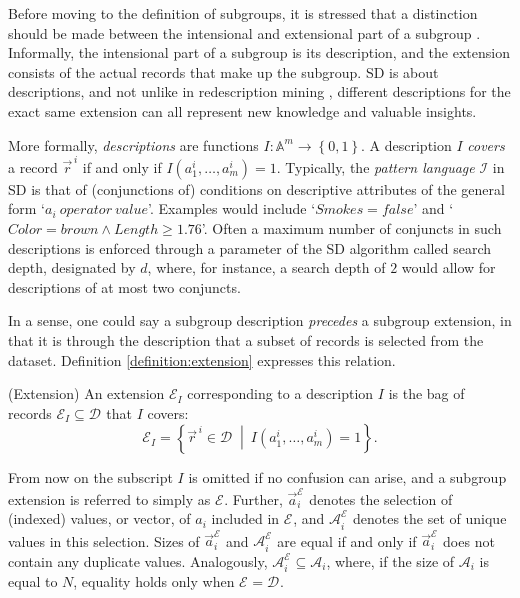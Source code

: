 \documentclass[smallextended]{svjour3}
\newcommand{\subgroup}[1]{\mbox{`$#1$'}}
\newcommand{\ds}[1]{\mathcal{D}_{#1}}
\newcommand{\extension}[1]{\mathcal{E}_{#1}}
\newcommand{\intension}{I}
\newcommand{\sd}{SD}
\begin{document}
Before moving to the definition of subgroups, it is stressed that a distinction should be made between the intensional and extensional part of a subgroup \cite{meeng:2014}.
Informally, the intensional part of a subgroup is its description, and the extension consists of the actual records that make up the subgroup.
\sd{} is about descriptions, and not unlike in redescription mining \cite{galbrun:2018}, different descriptions for the exact same extension can all represent new knowledge and valuable insights.

More formally, \emph{descriptions} are functions $\intension{}: \mathbb{A}^m \to \left\{0,1\right\}$.
A description $\intension{}$ \emph{covers} a record $\vec{r}^{\,i}$ if and only if $\intension{} \left(a_1^i, \ldots ,a_m^i\right) = 1$.
Typically, the \emph{pattern language} $\mathcal{\intension{}}$ in \sd{} is that of (conjunctions of) conditions on descriptive attributes of the general form \subgroup{a_i\ operator\ value}.
Examples would include \subgroup{Smokes = false} and \subgroup{Color = brown \wedge Length \geq 1.76}.
Often a maximum number of conjuncts in such descriptions is enforced through a parameter of the \sd{} algorithm called search depth, designated by $d$, where, for instance, a search depth of $2$ would allow for descriptions of at most two conjuncts.

In a sense, one could say a subgroup description \emph{precedes} a subgroup extension, in that it is through the description that a subset of records is selected from the dataset.
Definition \ref{definition:extension} expresses this relation.

\begin{definition}{(Extension)}
\label{definition:extension}
An extension $\extension{\intension{}}$ corresponding to a description $\intension{}$ is the bag of records $\extension{\intension{}} \subseteq \ds{}$ that $\intension{}$ covers:
\begin{displaymath}
  \extension{\intension{}}=\left\{\vec{r}^{\,i} \in \ds{}\ \middle|\ \intension{}\left(a_1^i, \ldots, a_m^i\right) = 1\right\}.
\end{displaymath}
\end{definition}

From now on the subscript $\intension{}$ is omitted if no confusion can arise, and a subgroup extension is referred to simply as $\extension{}$.
Further, $\vec{a}_i^{\extension{}}$ denotes the selection of (indexed) values, or vector, of $a_i$ included in $\extension{}$, and $\mathcal{A}_i^{\extension{}}$ denotes the set of unique values in this selection.
Sizes of $\vec{a}_i^{\extension{}}$ and $\mathcal{A}_i^{\extension{}}$ are equal if and only if $\vec{a}_i^{\extension{}}$ does not contain any duplicate values.
Analogously, $\mathcal{A}_i^{\extension{}} \subseteq \mathcal{A}_i$, where, if the size of $\mathcal{A}_i$ is equal to $N$, equality holds only when $\extension{}=\ds{}$.
\end{document}
